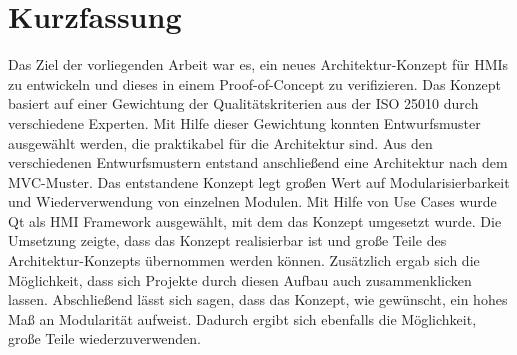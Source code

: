 \section*{Kurzfassung}

Das Ziel der vorliegenden Arbeit war es, ein neues Architektur-Konzept für \acp{HMI} zu entwickeln und dieses in einem Proof-of-Concept zu verifizieren. Das Konzept basiert auf einer Gewichtung der Qualitätskriterien aus der ISO 25010 durch verschiedene Experten. Mit Hilfe dieser Gewichtung konnten Entwurfsmuster ausgewählt werden, die praktikabel für die Architektur sind. Aus den verschiedenen Entwurfsmustern entstand anschließend eine Architektur nach dem \ac{MVC}-Muster. Das entstandene Konzept legt großen Wert auf Modularisierbarkeit und Wiederverwendung von einzelnen Modulen. Mit Hilfe von Use Cases wurde Qt als \ac{HMI} Framework ausgewählt, mit dem das Konzept umgesetzt wurde. Die Umsetzung zeigte, dass das Konzept realisierbar ist und große Teile des Architektur-Konzepts übernommen werden können. Zusätzlich ergab sich die Möglichkeit, dass sich Projekte durch diesen Aufbau auch zusammenklicken lassen. Abschließend lässt sich sagen, dass das Konzept, wie gewünscht, ein hohes Maß an Modularität aufweist. Dadurch ergibt sich ebenfalls die Möglichkeit, große Teile wiederzuverwenden.\\
  


\singlespacing

\newpage